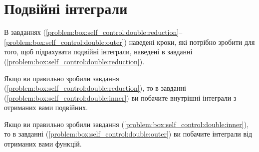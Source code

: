 \section{Подвійні інтеграли}
В завданнях (\ref{problem:box:self_control:double:reduction}--\ref{problem:box:self_control:double:outer}) наведені кроки, які потрібно зробити для того, щоб підрахувати подвійні інтеграли, наведені в завданні  (\ref{problem:box:self_control:double:reduction}).

Якщо ви правильно зробили завдання  (\ref{problem:box:self_control:double:reduction}), то в завданні (\ref{problem:box:self_control:double:inner}) ви побачите внутрішні інтеграли з отриманих вами подвійних.

Якщо ви правильно зробили завдання  (\ref{problem:box:self_control:double:inner}), то в завданні (\ref{problem:box:self_control:double:outer}) ви побачите інтеграли від отриманих вами функцій.

